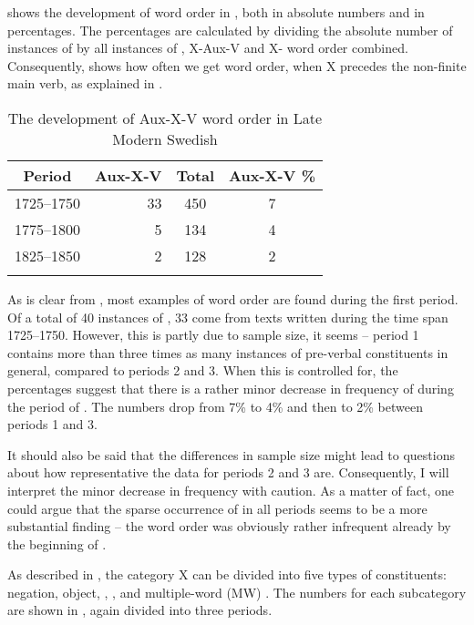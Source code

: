 \documentclass[output=paper, colorlinks, citecolor=brown]{langscibook}
\begin{document}
 shows the development of  word order in , both in absolute numbers and in percentages. The percentages are calculated by dividing the absolute number of instances of  by all instances of , X-Aux-V and X- word order combined. Consequently,  shows how often we get  word order, when X precedes the non-finite main verb, as explained in .



\begin{table}
\caption{The development of Aux-X-V word order in Late Modern Swedish\label{tab:sangfelt:1}}
\begin{tabular}{crcc}
\lsptoprule
Period & {Aux-X-V} & Total & {Aux-X-V} \%\\
\midrule
1725–1750 & 33 & 450 & 7\\
1775–1800 & 5 & 134 & 4\\
1825–1850 & 2 & 128 & 2\\
\lspbottomrule
\end{tabular}
\end{table}

As is clear from , most examples of  word order are found during the first period. Of a total of 40 instances of , 33 come from texts written during the time span 1725–1750. However, this is partly due to sample size, it seems – period 1 contains more than three times as many instances of pre-verbal constituents in general, compared to periods 2 and 3. When this is controlled for, the percentages suggest that there is a rather minor decrease in frequency of  during the period of . The numbers drop from 7\% to 4\% and then to 2\% between periods 1 and 3.

It should also be said that the differences in sample size might lead to questions about how representative the data for periods 2 and 3 are. Consequently, I will interpret the minor decrease in frequency with caution. As a matter of fact, one could argue that the sparse occurrence of  in all periods seems to be a more substantial finding – the word order was obviously rather infrequent already by the beginning of .

As described in , the category X can be divided into five types of constituents: negation, object, , , and multiple-word (MW) . The numbers for each subcategory are shown in , again divided into three periods.
\end{document}
